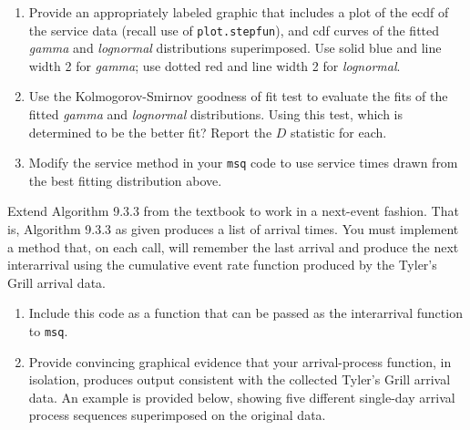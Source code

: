 \documentclass[11pt,addpoints,answers]{exam}
\begin{document}
\begin{questions}
\begin{enumerate}
    \item Provide an appropriately labeled graphic that includes a plot of
      the ecdf of the service data (recall use of {\tt plot.stepfun}), and cdf
      curves of the fitted {\it gamma} and {\it lognormal} distributions
      superimposed.
      Use solid blue and line width 2 for {\it gamma}; use dotted red and line
      width 2 for {\it lognormal}.
      \begin{solution}
      \end{solution}
      
    \item Use the Kolmogorov-Smirnov goodness of fit test to evaluate the
      fits of the fitted {\it gamma} and {\it lognormal} distributions.
      Using this test, which is determined to be the better fit?
      Report the $D$ statistic for each.
      \begin{solution}
      \end{solution}
      
    \item Modify the service method in your {\tt msq} code to use service
      times drawn from the best fitting distribution above.
  \end{enumerate}
   
  \question Extend Algorithm 9.3.3 from the textbook to work in a next-event
  fashion.  That is, Algorithm 9.3.3 as given produces a list of arrival times.
  You must implement a method that, on each call, will remember the last
  arrival and produce the next interarrival using the cumulative event rate
  function produced by the Tyler's Grill arrival data.
  \begin{enumerate}
    \item Include this code as a function that can be passed as the
      interarrival function to {\tt msq}.
    \item Provide convincing graphical evidence that your arrival-process
      function, in isolation, produces output consistent with the collected
      Tyler's Grill arrival data.
      An example is provided below, showing five different single-day arrival
      process sequences superimposed on the original data.
      \begin{solution}
        \begin{center}
        \end{center}
      \end{solution}
  \end{enumerate}
  

\end{questions}
\end{document}
